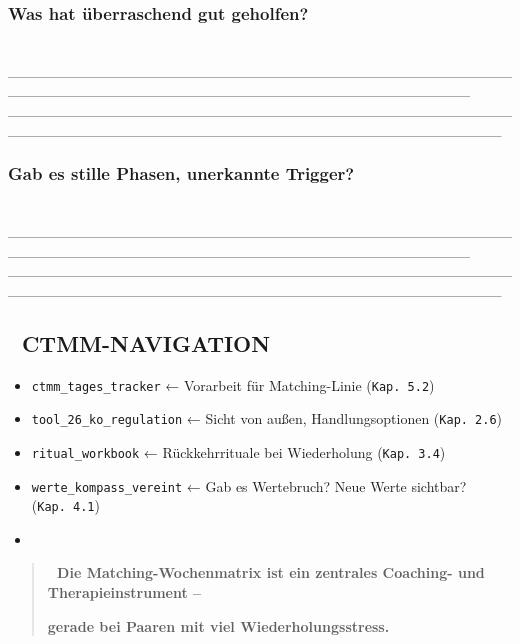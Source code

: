 \hypertarget{was-hat-uxfcberraschend-gut-geholfen}{%
\subsubsection{\texorpdfstring{\textbf{Was hat überraschend gut geholfen?}}{Was hat überraschend gut geholfen?}}\label{was-hat-uxfcberraschend-gut-geholfen}}

🧠 \_\_\_\_\_\_\_\_\_\_\_\_\_\_\_\_\_\_\_\_\_\_\_\_\_\_\_\_\_\_\_\_\_\_\_\_\_\_\_\_\_\_\_\_\_\_\_\_\_\_\_\_\_\_\_\_\_\_\_\_\_\_\_\_\_\_\_\_\_\_\_\_\_\_\_\_\_\_\_\_\_\_\_\_\_\_\_\_\_\_\_\_ \_\_\_\_\_\_\_\_\_\_\_\_\_\_\_\_\_\_\_\_\_\_\_\_\_\_\_\_\_\_\_\_\_\_\_\_\_\_\_\_\_\_\_\_\_\_\_\_\_\_\_\_\_\_\_\_\_\_\_\_\_\_\_\_\_\_\_\_\_\_\_\_\_\_\_\_\_\_\_\_\_\_\_\_\_\_\_\_\_\_\_\_\_\_\_

\hypertarget{gab-es-stille-phasen-unerkannte-trigger}{%
\subsubsection{\texorpdfstring{\textbf{Gab es stille Phasen, unerkannte Trigger?}}{Gab es stille Phasen, unerkannte Trigger?}}\label{gab-es-stille-phasen-unerkannte-trigger}}

🧠 \_\_\_\_\_\_\_\_\_\_\_\_\_\_\_\_\_\_\_\_\_\_\_\_\_\_\_\_\_\_\_\_\_\_\_\_\_\_\_\_\_\_\_\_\_\_\_\_\_\_\_\_\_\_\_\_\_\_\_\_\_\_\_\_\_\_\_\_\_\_\_\_\_\_\_\_\_\_\_\_\_\_\_\_\_\_\_\_\_\_\_\_ \_\_\_\_\_\_\_\_\_\_\_\_\_\_\_\_\_\_\_\_\_\_\_\_\_\_\_\_\_\_\_\_\_\_\_\_\_\_\_\_\_\_\_\_\_\_\_\_\_\_\_\_\_\_\_\_\_\_\_\_\_\_\_\_\_\_\_\_\_\_\_\_\_\_\_\_\_\_\_\_\_\_\_\_\_\_\_\_\_\_\_\_\_\_\_

\hypertarget{ctmm-navigation}{%
\subsection{\texorpdfstring{\textbf{🧭 CTMM-NAVIGATION}}{🧭 CTMM-NAVIGATION}}\label{ctmm-navigation}}

\begin{itemize}
\tightlist
\item
  \texttt{ctmm\_tages\_tracker} ← Vorarbeit für Matching-Linie (\texttt{Kap.\ 5.2})
\item
  \texttt{tool\_26\_ko\_regulation} ← Sicht von außen, Handlungsoptionen (\texttt{Kap.\ 2.6})
\item
  \texttt{ritual\_workbook} ← Rückkehrrituale bei Wiederholung (\texttt{Kap.\ 3.4})
\item
  \texttt{werte\_kompass\_vereint} ← Gab es Wertebruch? Neue Werte sichtbar? (\texttt{Kap.\ 4.1})
\item
\end{itemize}

\begin{quote}
\textbf{📎 Die Matching-Wochenmatrix ist ein zentrales Coaching- und Therapieinstrument --}

\textbf{gerade bei Paaren mit viel Wiederholungsstress.}
\end{quote}


